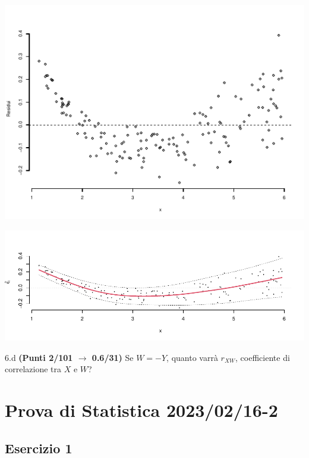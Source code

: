 \documentclass[
  11pt,
]{book}
\theoremstyle{mytheoremstyle}
\theoremstyle{mydefstyle}
\newenvironment{sol}
  {
  \begin{tcolorbox}[enhanced,breakable,arc=0.1mm,boxrule=1pt,colback=white,colframe=iblue,
  title=\bf \fontfamily{lmss}\selectfont \hspace{.5 cm} Soluzione,drop fuzzy shadow]

}{
\end{tcolorbox}
  }
\begin{document}
\begin{center}\includegraphics{Esami_passati_con_soluzioni_files/figure-latex/2023-18,-1} \end{center}

\begin{sol}

\begin{center}\includegraphics{Esami_passati_con_soluzioni_files/figure-latex/2023-19,-1} \end{center}

\end{sol}

6.d \textbf{(Punti 2/101 \(\rightarrow\) 0.6/31)} Se \(W=- Y\), quanto varrà \(r_{XW}\), coefficiente di correlazione tra \(X\) e \(W\)?

\section{Prova di Statistica 2023/02/16-2}\label{prova-di-statistica-20230216-2}

\subsection{Esercizio 1}\label{esercizio-1-23}
\end{document}
